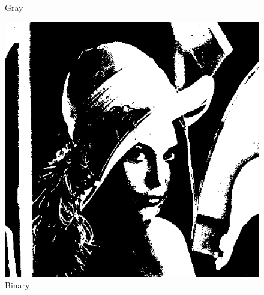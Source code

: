 \documentclass[11pt,a4paper]{article}
\begin{document}
\begin{figure}[ht!]
\begin{minipage}{0.3\textwidth}
        \caption{Gray}
    \end{minipage}
    \quad
    \begin{minipage}{0.3\textwidth}
        \centering
        \includegraphics[width=\linewidth]{figs/task4/binary.png}
        \caption{Binary}
    \end{minipage}
\end{figure}

\newpage
\end{document}
